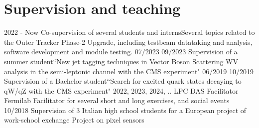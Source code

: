 \section{Supervision and teaching}


   \teaching
    {2022 - Now}
    {Co-supervision of several students and interns}{Several topics related to the  Outer Tracker Phase-2 Upgrade, including testbeam datataking and analysis, software development and module testing.}
  \teaching
    {07/2023 \textemdash{} 09/2023}
    {Supervision of a summer student}{``New jet tagging techniques in Vector Boson Scattering WV analysis in the semi-leptonic channel with the CMS experiment"}
  \teaching
    {06/2019 \textemdash{} 10/2019}
    {Supervision of a Bachelor student}{``Search for excited quark states decaying to qW/qZ with the CMS experiment"}
      \position
      {2022, 2023, 2024, ..} 
      {LPC DAS Facilitator}
      {Fermilab}
      {Facilitator for several short and long exercises, and social events}
  \teaching
    {10/2018}
    {Supervision of 3 Italian high school students for a European project of work-school exchange}
    {Project on pixel sensors}
